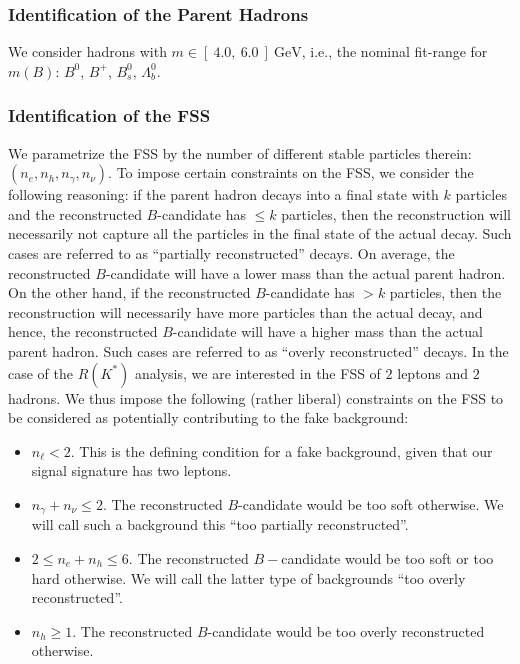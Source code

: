 \subsubsection*{Identification of the Parent Hadrons}
We consider hadrons with $m\in[\ 4.0,\ 6.0\ ]\ \text{GeV}$, i.e., the nominal fit-range for $m(B)$: $B^0$, $B^+$, $B_s^0$, $\Lambda_b^0$.
\subsubsection*{Identification of the FSS}
We parametrize the FSS by the number of different stable particles therein: $(n_e, n_h, n_\gamma, n_\nu)$. %
To impose certain constraints on the FSS, we consider the following reasoning: if the parent hadron decays into a final state with $k$ particles and the reconstructed $B$-candidate has $\leq k$ particles, then the reconstruction will necessarily not capture all the particles in the final state of the actual decay. %
Such cases are referred to as ``partially reconstructed'' decays. On average, the reconstructed $B$-candidate will have a lower mass than the actual parent hadron. %
On the other hand, if the reconstructed $B$-candidate has $> k$ particles, then the reconstruction will necessarily have more particles than the actual decay, and hence, the reconstructed $B$-candidate will have a higher mass than the actual parent hadron. %
Such cases are referred to as ``overly reconstructed'' decays. %
In the case of the $R(K^\ast)$ analysis, we are interested in the FSS of $2$ leptons and $2$ hadrons. %
We thus impose the following (rather liberal) constraints on the FSS to be considered as potentially contributing to the fake background:
        		\begin{itemize}
                    \item $n_\ell < 2$. This is the defining condition for a fake background, given that our signal signature has two leptons. %
                    \item $n_\gamma + n_\nu \leq 2$. The reconstructed $B$-candidate would be too soft otherwise. We will call such a background this ``too partially reconstructed''.
	        		\item $2\leq n_e + n_h \leq 6$. The reconstructed $B-$candidate would be too soft or too hard otherwise. We will call the latter type of backgrounds ``too overly reconstructed''.
	        		\item $n_h \geq 1$. The reconstructed $B$-candidate would be too overly reconstructed otherwise. 
		        \end{itemize}
